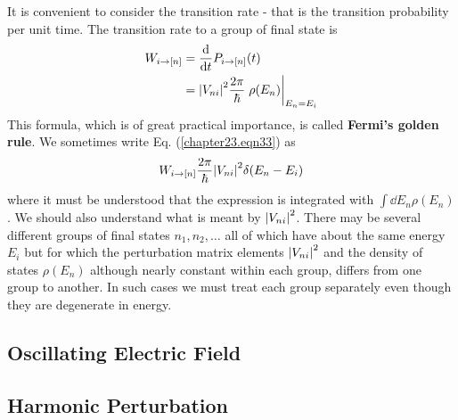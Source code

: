 It is convenient to consider the transition rate - that is the transition probability per unit time. The transition rate to a group of final state is
\begin{align}
W_{i \rightarrow [n]} &= \dv{}{t} P_{i \rightarrow [n]}(t) \nonumber\\
&= \abs{V_{n i}}^2 \frac{2\pi}{\hbar} \eval{\rho(E_n)}_{E_n=E_i}
\label{chapter23.eqn33}
\end{align}
This formula, which is of great practical importance, is called \textbf{Fermi's golden rule}. We sometimes write Eq. (\ref{chapter23.eqn33}) as
\begin{equation}
\label{chapter23.eqn34}
W_{i \rightarrow [n]} \frac{2 \pi}{\hbar} \abs{V_{n i}}^2 \delta(E_n - E_i)
\end{equation}
where it must be understood that the expression is integrated with $\int \dd{E_n} \rho(E_n)$.
We should also understand what is meant by $\abs{V_{n i}}^2$. There may be several different groups of final states $n_1, n_2, \ldots$ all of which have about the same energy $E_i$ but for which the perturbation matrix elements $\abs{V_{n i}}^2$ and the density of states $\rho(E_n)$ although nearly constant within each group, differs from one group to another. In such cases we must treat each group separately even though they are degenerate in energy.


\subsection{Oscillating Electric Field}

\subsection{Harmonic Perturbation}


